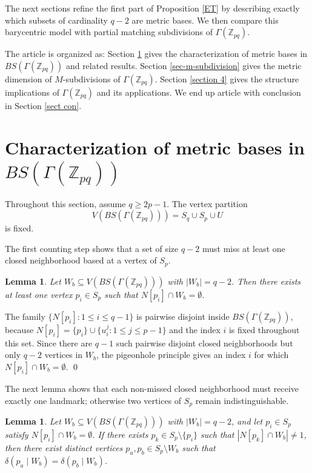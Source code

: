 \documentclass[12pt]{article}
\renewenvironment{proof}{{\bf \noindent Proof.}}{\qed}
\newtheorem{lemma}[theorem]{Lemma}
\begin{document}
The next sections refine the first part of Proposition \ref{ET} by describing exactly which subsets of cardinality $q-2$ are metric bases. We then compare this barycentric model with partial matching subdivisions of $\Gamma(\mathbb Z_{pq})$.


\medskip
The article is organized as: Section \ref{sec-2} gives the characterization of metric bases in $BS(\Gamma(\mathbb Z_{pq}))$ and related results.  Section \ref{sec-m-subdivision} gives the metric dimension of $M$-subdivisions of $\Gamma(\mathbb Z_{pq})$. Section \ref{section 4} gives the structure implications of $\Gamma(\mathbb Z_{pq})$ and its applications. We end up article with conclusion in Section \ref{sect con}.

\section{Characterization of metric bases in $BS(\Gamma(\mathbb Z_{pq}))$}\label{sec-2}

Throughout this section, assume $q\geq 2p-1$. The vertex partition
$$
V(BS(\Gamma(\mathbb Z_{pq})))=S_q\cup S_p\cup U
$$
is fixed.

\noindent The first counting step shows that a set of size $q-2$ must miss at least one closed neighborhood based at a vertex of $S_p$.
\begin{lemma}\rm \cite{fault}\label{lemma1}
Let $W_b\subseteq V(BS(\Gamma(\mathbb Z_{pq})))$ with $|W_b|=q-2$. Then there exists at least one vertex $p_i\in S_p$ such that $N[p_i]\cap W_b=\emptyset$.
\end{lemma}

\begin{proof}
The family $\{N[p_i]:1\leq i\leq q-1\}$ is pairwise disjoint inside $BS(\Gamma(\mathbb Z_{pq}))$, because $N[p_i]=\{p_i\}\cup\{u_i^j:1\leq j\leq p-1\}$ and the index $i$ is fixed throughout this set. Since there are $q-1$ such pairwise disjoint closed neighborhoods but only $q-2$ vertices in $W_b$, the pigeonhole principle gives an index $i$ for which $N[p_i]\cap W_b=\emptyset$.
\end{proof}

\medskip
\noindent The next lemma shows that each non-missed closed neighborhood must receive exactly one landmark; otherwise two vertices of $S_p$ remain indistinguishable.
\begin{lemma}\label{lemma-mid-set}
Let $W_b\subseteq V(BS(\Gamma(\mathbb Z_{pq})))$ with $|W_b|=q-2$, and let $p_i\in S_p$ satisfy $N[p_i]\cap W_b=\emptyset$. If there exists $p_k\in S_p\setminus\{p_i\}$ such that $|N[p_k]\cap W_b|\neq 1$, then there exist distinct vertices $p_a,p_b\in S_p\setminus W_b$ such that $\delta(p_a\mid W_b)=\delta(p_b\mid W_b)$.
\end{lemma}
\end{document}
